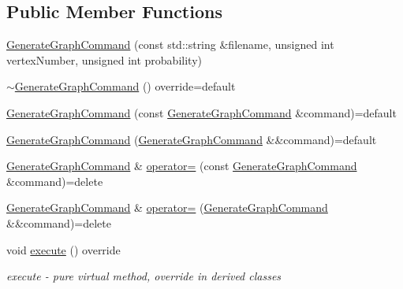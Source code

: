 \subsection*{Public Member Functions}
\begin{DoxyCompactItemize}
\item 
\hyperlink{classmin__path_1_1command__handler_1_1_generate_graph_command_ad023d97ba753b8ccc81548dec2874d16}{Generate\+Graph\+Command} (const std\+::string \&filename, unsigned int vertex\+Number, unsigned int probability)
\item 
\hyperlink{classmin__path_1_1command__handler_1_1_generate_graph_command_a15521f939e551a1f8a02e0051cad75e6}{$\sim$\+Generate\+Graph\+Command} () override=default
\item 
\hyperlink{classmin__path_1_1command__handler_1_1_generate_graph_command_ac6c083c3a1125922bece382628be07b4}{Generate\+Graph\+Command} (const \hyperlink{classmin__path_1_1command__handler_1_1_generate_graph_command}{Generate\+Graph\+Command} \&command)=default
\item 
\hyperlink{classmin__path_1_1command__handler_1_1_generate_graph_command_a5413de4b4729b780acb8219a72940535}{Generate\+Graph\+Command} (\hyperlink{classmin__path_1_1command__handler_1_1_generate_graph_command}{Generate\+Graph\+Command} \&\&command)=default
\item 
\hyperlink{classmin__path_1_1command__handler_1_1_generate_graph_command}{Generate\+Graph\+Command} \& \hyperlink{classmin__path_1_1command__handler_1_1_generate_graph_command_a0c20d65ffe490778db13d9b02c8a93f3}{operator=} (const \hyperlink{classmin__path_1_1command__handler_1_1_generate_graph_command}{Generate\+Graph\+Command} \&command)=delete
\item 
\hyperlink{classmin__path_1_1command__handler_1_1_generate_graph_command}{Generate\+Graph\+Command} \& \hyperlink{classmin__path_1_1command__handler_1_1_generate_graph_command_a78458bc559961c2cc08a64882fdd5261}{operator=} (\hyperlink{classmin__path_1_1command__handler_1_1_generate_graph_command}{Generate\+Graph\+Command} \&\&command)=delete
\item 
void \hyperlink{classmin__path_1_1command__handler_1_1_generate_graph_command_ab12982f085f5974e6922aca8959400af}{execute} () override
\begin{DoxyCompactList}\small\item\em execute -\/ pure virtual method, override in derived classes \end{DoxyCompactList}\end{DoxyCompactItemize}


